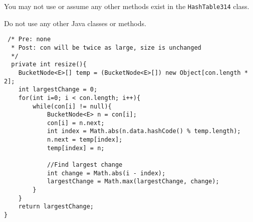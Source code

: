 \documentclass[12pt,letter]{article}
\begin{document}
\noindent You may not use or assume any other methods exist in the \texttt{HashTable314} class.

\noindent Do not use any other Java classes or methods.

\clearpage
\begin{verbatim}
 /* Pre: none
  * Post: con will be twice as large, size is unchanged
  */
  private int resize(){
    BucketNode<E>[] temp = (BucketNode<E>[]) new Object[con.length * 2];
    int largestChange = 0;
    for(int i=0; i < con.length; i++){
        while(con[i] != null){
            BucketNode<E> n = con[i];
            con[i] = n.next;
            int index = Math.abs(n.data.hashCode() % temp.length);
            n.next = temp[index];
            temp[index] = n;

            //Find largest change
            int change = Math.abs(i - index);
            largestChange = Math.max(largestChange, change);
        }
    }
    return largestChange;
}
\end{verbatim}
\end{document}
